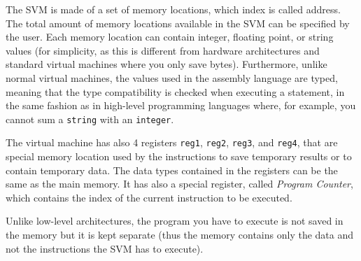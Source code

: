 The SVM is made of a set of memory locations, which index is called address. The total amount of memory locations available in the SVM can be specified by the user. Each memory location can contain integer, floating point, or string values (for simplicity, as this is different from hardware architectures and standard virtual machines where you only save bytes). Furthermore, unlike normal virtual machines, the values used in the assembly language are typed, meaning that the type compatibility is checked when executing a statement, in the same fashion as in high-level programming languages where, for example, you cannot sum a \texttt{string} with an \texttt{integer}.

The virtual machine has also 4 registers \texttt{reg1}, \texttt{reg2}, \texttt{reg3}, and \texttt{reg4}, that are special memory location used by the instructions to save temporary results or to contain temporary data. The data types contained in the registers can be the same as the main memory. It has also a special register, called \textit{Program Counter}, which contains the index of the current instruction to be executed.

Unlike low-level architectures, the program you have to execute is not saved in the memory but it is kept separate (thus the memory contains only the data and not the instructions the SVM has to execute).